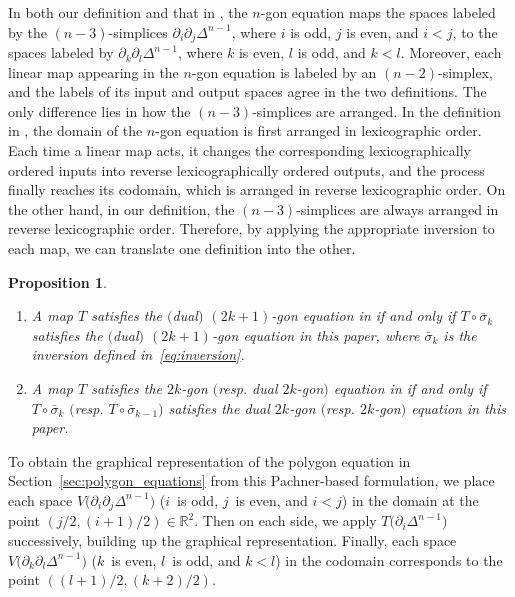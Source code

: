 \documentclass[pdftex]{sigma}
\numberwithin{equation}{section}
\newtheorem{Proposition}[Theorem]{Proposition}
\theoremstyle{definition}
\begin{document}
In both our definition and that in \cite{dimakis2015simplex}, the $n$-gon equation maps the spaces labeled by the $(n-3)$-simplices $\partial_i\partial_j\Delta^{n-1}$, where $i$ is odd, $j$ is even, and $i<j$, to the spaces labeled by $\partial_k\partial_l\Delta^{n-1}$, where $k$ is even, $l$ is odd, and $k<l$. Moreover, each linear map appearing in the $n$\nobreakdash-gon equation is labeled by an $(n-2)$-simplex, and the labels of its input and output spaces agree in the two definitions.
The only difference lies in how the $(n-3)$-simplices are arranged.
In the definition in \cite{dimakis2015simplex}, the domain of the $n$-gon equation is first arranged in lexicographic order. Each time a linear map acts, it changes the corresponding lexicographically ordered inputs into reverse lexicographically ordered outputs, and the process finally reaches its codomain, which is arranged in reverse lexicographic order. On the other hand, in our definition, the $(n-3)$-simplices are always arranged in reverse lexicographic order. Therefore, by applying the appropriate inversion to each map, we can translate one definition into the other. %
\begin{Proposition}\quad\samepage
 \begin{enumerate}\itemsep=0pt
 \item[$(1)$] A map $T$ satisfies the $($dual$)$ $(2k+1)$-gon equation in {\rm \cite{dimakis2015simplex}} if and only if $T\circ\bar{\sigma}_k$ satisfies the $($dual$)$ $(2k+1)$-gon equation in this paper, where $\bar{\sigma}_k$ is the inversion defined in~\eqref{eq:inversion}.
 \item[$(2)$] A map $T$ satisfies the $2k$-gon $($resp. dual $2k$-gon$)$ equation in {\rm \cite{dimakis2015simplex}} if and only if $T\circ\bar{\sigma}_k$ $($resp. $T\circ\bar{\sigma}_{k-1})$ satisfies the dual $2k$-gon $($resp. $2k$-gon$)$ equation in this paper.
 \end{enumerate}
\end{Proposition}


To obtain the graphical representation of the polygon equation in Section~\ref{sec:polygon_equations} from this Pachner-based formulation, we place each space $V\bigl(\partial_i\partial_j\Delta^{n-1}\bigr)$ ($i$~is odd, $j$~is even, and $i<j$) in the domain at the point $(j/2, (i+1)/2)\in\mathbb{R}^2$. Then on each side, we apply $T\bigl(\partial_i\Delta^{n-1}\bigr)$ successively, building up the graphical representation. Finally, each space $V\bigl(\partial_k\partial_l\Delta^{n-1}\bigr)$ ($k$~is even, $l$~is odd, and $k<l$) in the codomain corresponds to the point $((l+1)/2,(k+2)/2)$.
\end{document}
